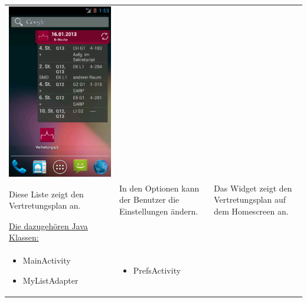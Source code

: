 \documentclass[12pt,headsepline]{scrartcl}
\begin{document}
\begin{center}
\begin{longtable}{p{5cm}p{5cm}p{5cm}}
\includegraphics[scale=0.28,keepaspectratio=true]{device-2013-01-16-103244.png}\\
Diese Liste zeigt den Vertretungsplan an. &
In den Optionen kann der Benutzer die Einstellungen ändern. &
Das Widget zeigt den Vertretungsplan auf dem Homescreen an.\\
\underline{Die dazugehören Java Klassen:}& & \\
\begin{itemize}
 \item MainActivity
 \item MyListAdapter
\end{itemize} &
\begin{itemize}
 \item PrefsActivity

\end{itemize}
\end{longtable}
\end{center}
\end{document}
